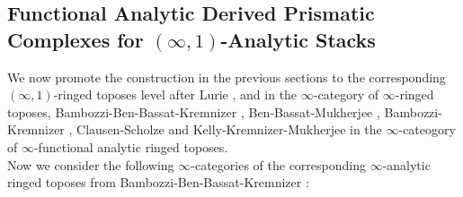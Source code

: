 \documentclass[11pt]{book}
\theoremstyle{definition}
\numberwithin{equation}{section}
\begin{document}
\subsection{Functional Analytic Derived Prismatic Complexes for $(\infty,1)$-Analytic Stacks}

\indent We now promote the construction in the previous sections to the corresponding $(\infty,1)$-ringed toposes level after Lurie \cite{12Lu1}, \cite{12Lu2} and \cite{Lu3} in the $\infty$-category of $\infty$-ringed toposes, Bambozzi-Ben-Bassat-Kremnizer \cite{12BBBK}, Ben-Bassat-Mukherjee \cite{BBM}, Bambozzi-Kremnizer \cite{12BK}, Clausen-Scholze \cite{12CS1} \cite{12CS2} and Kelly-Kremnizer-Mukherjee \cite{KKM} in the $\infty$-cateogory of $\infty$-functional analytic ringed toposes.\\

\indent Now we consider the following $\infty$-categories of the corresponding $\infty$-analytic ringed toposes from Bambozzi-Ben-Bassat-Kremnizer \cite{12BBBK}:\\
\end{document}
